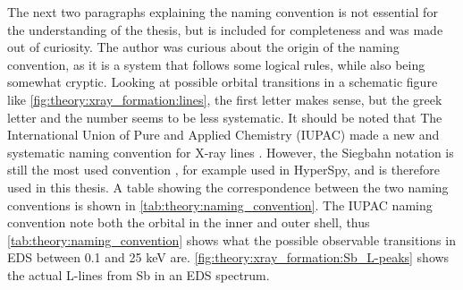 The next two paragraphs explaining the naming convention is not essential for the understanding of the thesis, but is included for completeness and was made out of curiosity.
The author was curious about the origin of the naming convention, as it is a system that follows some logical rules, while also being somewhat cryptic.
Looking at possible orbital transitions in a schematic figure like \cref{fig:theory:xray_formation:lines}, the first letter makes sense, but the greek letter and the number seems to be less systematic.
It should be noted that The International Union of Pure and Applied Chemistry (IUPAC) made a new and systematic naming convention for X-ray lines \cite{IUPAC_nomenclature1991}.
However, the Siegbahn notation is still the most used convention \cite[Ch. 4.2.4]{goldstein_scanning_2018}, for example used in HyperSpy, and is therefore used in this thesis.
A table showing the correspondence between the two naming conventions is shown in \cref{tab:theory:naming_convention}.
The IUPAC naming convention note both the orbital in the inner and outer shell, thus \cref{tab:theory:naming_convention} shows what the possible observable transitions in EDS between 0.1 and 25 keV are.
\cref{fig:theory:xray_formation:Sb_L-peaks} shows the actual L-lines from Sb in an EDS spectrum.



